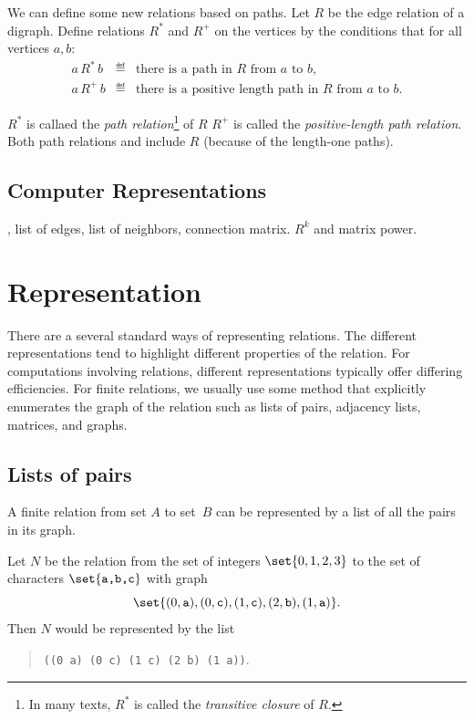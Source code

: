 We can define some new relations based on paths.  Let $R$ be the edge
relation of a digraph.  Define relations $R^*$ and $R^+$ on the vertices
by the conditions that for all vertices $a,b$:
\begin{eqnarray*}
a\, R^*\, b &\eqdef& \mbox{there is a path in $R$ from $a$ to $b$},\\
a\, R^+\, b &\eqdef& \mbox{there is a positive length path in $R$ from $a$ to $b$}.
\end{eqnarray*}

$R^*$ is callaed the \emph{path relation}\footnote{In many texts, $R^*$ is
  called the \emph{transitive closure} of $R$.} of $R$ $R^+$ is called the
\emph{positive-length path relation}.  Both path relations and include $R$
(because of the length-one paths).


\subsection{Computer Representations 
}

, list of edges, list of neighbors, connection matrix.
$R^k$ and matrix power. 


\section{Representation}

There are a several standard ways of representing relations.  The
different representations tend to highlight different properties of the
relation.  For computations involving relations, different representations
typically offer differing efficiencies.  For finite relations, we usually
use some method that explicitly enumerates the graph of the relation such
as lists of pairs, adjacency lists, matrices, and graphs.

\subsection{Lists of pairs}

A finite relation from set $A$ to set~$B$ can be represented by a list of
all the pairs in its graph.

\begin{example} \label{ex:0123-abc}
Let $N$ be the relation from the set of integers $\set{0, 1, 2, 3}$ to the
set of characters $\set{\texttt{a,b,c}}$ with graph
\[
\set{(0,\texttt{a}), (0, \texttt{c}), (1, \texttt{c}), (2, \texttt{b}),
(1,\texttt{a})}.
\]
Then $N$ would be represented by the list
\begin{quote}
\texttt{((0 a) (0 c) (1 c) (2 b) (1 a))}.
\end{quote}
\end{example}

